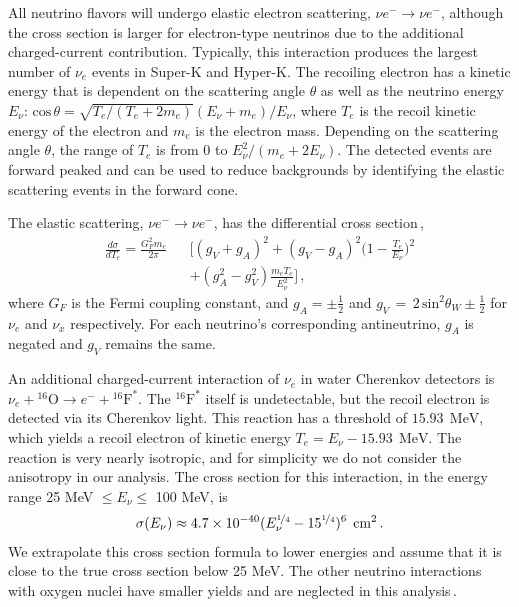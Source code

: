 \documentclass[aps,reprint,superscriptaddress]{revtex4-1}
\begin{document}
All neutrino flavors will undergo elastic electron scattering, $\nu e^{-}\rightarrow \nu e^{-}$, although the cross section is larger for electron-type neutrinos due to the additional charged-current contribution. Typically, this interaction produces the largest number of $\nu_e$ events in Super-K and Hyper-K.  The recoiling electron has a kinetic energy that is dependent on the scattering angle $\theta$ as well as the neutrino energy $E_{\nu}$: $\text{cos}\,\theta=\sqrt{T_{e}/(T_{e}+2m_{e})}(E_{\nu}+m_{e})/E_{\nu}$, where $T_{e}$ is the recoil kinetic energy of the electron and $m_{e}$ is the electron mass.  Depending on the scattering angle $\theta$, the range of $T_{e}$ is from 0 to $E_{\nu}^{2}/(m_{e}+2E_{\nu})$.  The detected events are forward peaked and can be used to reduce backgrounds by identifying the elastic scattering events in the forward cone.

The elastic scattering, $\nu e^- \rightarrow \nu e^-$, has the differential cross section\,\cite{Vogel:1989iv},
\begin{eqnarray} \label{eq:dSigdTeScat}
\frac{d\sigma}{dT_{e}}=\frac{G_{F}^{2}m_{e}}{2\pi} && \bigg[(g_{V}+g_{A})^{2}+(g_{V}-g_{A})^{2}\bigg(1-\frac{T_{e}}{E_{\nu}}\bigg)^{2} \nonumber \\
&&+(g_{A}^{2}-g_{V}^{2})\frac{m_{e}T_{e}}{E_{\nu}^{2}}\bigg]\,,
\end{eqnarray}
where $G_{F}$ is the Fermi coupling constant, and $g_{A}=\pm\frac{1}{2}$ and $g_{V}\,=\,2\,\text{sin}^{2}\theta_{W}\pm\frac{1}{2}$ for $\nu_{e}$ and $\nu_{x}$ respectively. For each neutrino's corresponding antineutrino, $g_{A}$ is negated and $g_{V}$ remains the same. 

An additional charged-current interaction of $\nu_e$ in water Cherenkov detectors is $\nu_{e}+{}^{16}\text{O}\rightarrow e^{-}+{}^{16}\text{F}^{*}$. The $^{16}\text{F}^{*}$ itself is undetectable, but the recoil electron is detected via its Cherenkov light. This reaction has a threshold of $15.93\:\:\text{MeV}$, which yields a recoil electron of kinetic energy $T_{e}=E_{\nu}-15.93\:\:\text{MeV}$.  The reaction is very nearly isotropic, and for simplicity we do not consider the anisotropy in our analysis.  The cross section for this interaction, in the energy range 25 MeV $\leq E_{\nu} \leq$ 100 MeV, is\,\cite{Haxton:1987kc} 
\begin{eqnarray} \label{eq:crossSecO}
\sigma(E_{\nu})\approx4.7\times10^{-40}(E_{\nu}^{\nicefrac{1}{4}}-15^{\nicefrac{1}{4}})^{6}\:\:\text{cm}^{2}\,.
\end{eqnarray}
We extrapolate this cross section formula to lower energies and assume that it is close to the true cross section below 25 MeV. The other neutrino interactions with oxygen nuclei have smaller yields and are neglected in this analysis\,\cite{Balasi:2015dba,Langanke:1995he,Nussinov:2000qc}.
\end{document}
